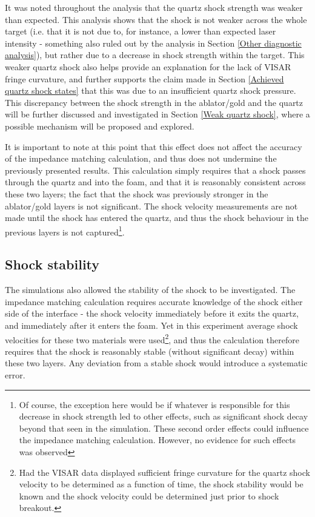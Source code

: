 It was noted throughout the analysis that the quartz shock strength was weaker than expected. This analysis shows that the shock is not weaker across the whole target (i.e. that it is not due to, for instance, a lower than expected laser intensity - something also ruled out by the analysis in Section \ref{Other diagnostic analysis}), but rather due to a decrease in shock strength within the target. This weaker quartz shock also helps provide an explanation for the lack of VISAR fringe curvature, and further supports the claim made in Section \ref{Achieved quartz shock states} that this was due to an insufficient quartz shock pressure. This discrepancy between the shock strength in the ablator/gold and the quartz will be further discussed and investigated in Section \ref{Weak quartz shock}, where a possible mechanism will be proposed and explored.

It is important to note at this point that this effect does not affect the accuracy of the impedance matching calculation, and thus does not undermine the previously presented results. This calculation simply requires that a shock passes through the quartz and into the foam, and that it is reasonably consistent across these two layers; the fact that the shock was previously stronger in the ablator/gold layers is not significant. The shock velocity measurements are not made until the shock has entered the quartz, and thus the shock behaviour in the previous layers is not captured\footnote{Of course, the exception here would be if whatever is responsible for this decrease in shock strength led to other effects, such as significant shock decay beyond that seen in the simulation. These second order effects could influence the impedance matching calculation. However, no evidence for such effects was observed}.

\subsection{Shock stability}

The simulations also allowed the stability of the shock to be investigated. The impedance matching calculation requires accurate knowledge of the shock either side of the interface - the shock velocity immediately before it exits the quartz, and immediately after it enters the foam. Yet in this experiment average shock velocities for these two materials were used\footnote{Had the VISAR data displayed sufficient fringe curvature for the quartz shock velocity to be determined as a function of time, the shock stability would be known and the shock velocity could be determined just prior to shock breakout.}, and thus the calculation therefore requires that the shock is reasonably stable (without significant decay) within these two layers. Any deviation from a stable shock would introduce a systematic error.

